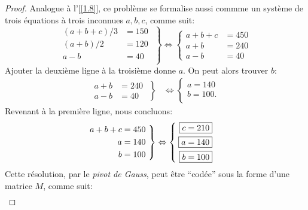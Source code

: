 \begin{proof}
Analogue à l'[\ref{1.8}], ce problème se formalise aussi commme un système de trois équations à trois inconnues $a, b, c$, %
comme suit:
%
\begin{equation}
  \left.
  \begin{aligned}
    (a+b+c)/3 &= 150\,\, \\
    (a+b)/2   &= 120 \\
    a - b           &= 40 \\
  \end{aligned}
  \right\} \iff
  \begin{cases} \label{1.9:equations}
    a+b+c &= 450 \\
    a+b   &= 240 \\
    a - b &= 40 
  \end{cases}
\end{equation}
%
Ajouter la deuxième ligne à la troisième donne $a$. On peut alors trouver $b$:
%
\begin{align}
  \left.
  \begin{aligned}
    a+b   &= 240\,\, \\
    a - b &= 40 
  \end{aligned}
  \right\} & \iff 
  \begin{cases}
    a = 140 \\
    b = 100. \\
  \end{cases}
\end{align}
%
Revenant à la première ligne, nous concluons:
%
\begin{align}
  \left.
  \begin{aligned}
    a + b + c &= 450\,\, \\
    a &= 140 \\
    b &= 100
  \end{aligned}
  \right\} & \iff
  \left\{
  \begin{aligned}
    \hspace{0.25em}\boxed{c = 210} \\
    \hspace{0.25em}\boxed{a = 140} \\
    \hspace{0.25em}\boxed{b = 100}
  \end{aligned}
  \right.
\end{align}
%
Cette résolution, par le \textit{pivot de Gauss}, peut être ``codée'' sous la forme d'une matrice $M$, comme suit:
%
\begin{align*}

\end{align*}
\end{proof}

